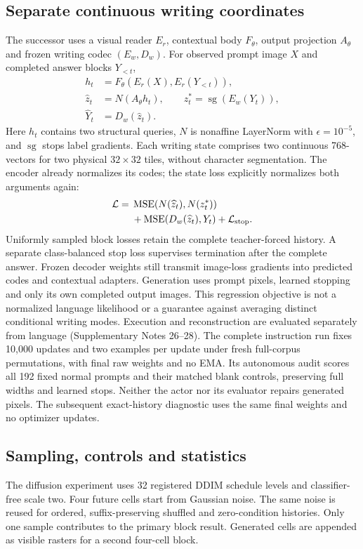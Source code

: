 \documentclass[12pt,a4paper]{article}
\begin{document}
\subsection*{Separate continuous writing coordinates}
The successor uses a visual reader $E_r$, contextual body $F_\theta$, output
projection $A_\theta$ and frozen writing codec $(E_w,D_w)$. For observed prompt
image $X$ and completed answer blocks $Y_{<t}$,
\begin{align}
 h_t &= F_\theta(E_r(X),E_r(Y_{<t})),\\
 \widehat z_t &= N(A_\theta h_t),\qquad z_t^*=\operatorname{sg}(E_w(Y_t)),\\
 \widehat Y_t &= D_w(\widehat z_t).
\end{align}
Here $h_t$ contains two structural queries, $N$ is nonaffine LayerNorm with
$\epsilon=10^{-5}$, and $\operatorname{sg}$ stops label gradients. Each writing
state comprises two continuous 768-vectors for two physical $32\times32$
tiles, without character segmentation. The encoder already normalizes its
codes; the state loss explicitly normalizes both arguments again:
\begin{equation}
 \begin{aligned}
 \mathcal L={}&\operatorname{MSE}(N(\widehat z_t),N(z_t^*))\\
 &+\operatorname{MSE}(D_w(\widehat z_t),Y_t)+\mathcal L_{\rm stop}.
 \end{aligned}
\end{equation}
Uniformly sampled block losses retain the complete teacher-forced history.
A separate class-balanced stop loss supervises termination after the complete
answer. Frozen decoder weights still transmit image-loss gradients into
predicted codes and contextual adapters. Generation uses prompt pixels,
learned stopping and only its own completed output images. This regression
objective is not a normalized language likelihood or a guarantee against
averaging distinct conditional writing modes. Execution and reconstruction
are evaluated separately from language (Supplementary Notes 26--28).
The complete instruction run fixes 10,000 updates and two examples per update
under fresh full-corpus permutations, with final raw weights and no EMA.
Its autonomous audit scores all 192 fixed normal prompts and their matched
blank controls, preserving full widths and learned stops. Neither the actor
nor its evaluator repairs generated pixels. The subsequent exact-history
diagnostic uses the same final weights and no optimizer updates.

\subsection*{Sampling, controls and statistics}
The diffusion experiment uses 32 registered DDIM schedule levels and classifier-free scale
two. Four future cells start from Gaussian noise. The same noise is reused for
ordered, suffix-preserving shuffled and zero-condition histories. Only one
sample contributes to the primary block result. Generated cells are appended
as visible rasters for a second four-cell block.
\end{document}
